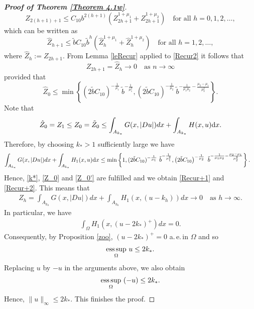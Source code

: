 \documentclass[10pt,reqno]{amsart}
\newcommand *\w{^\wedge}
\theoremstyle{definition}
\numberwithin{equation}{section}
\begin{document}
\begin{proof}[\textbf{Proof of Theorem \ref{Theorem 4.1w}}]
	\begin{equation*}
		Z_{2(h+1)+1}\leq C_{10} b^{2(h+1)}\left(Z_{2h+1}^{1+\mu_1}+Z_{2h+1}^{1+\mu_2}\right)\quad \text{for all } h=0,1,2,\ldots,
	\end{equation*}
	which can be written as
	\begin{equation}\label{Recur2}
		\hat{Z}_{h+1}\leq \tilde{b}C_{10} \tilde{b}^h\left(\hat{Z}_h^{1+\mu_1}+\hat{Z}_h^{1+\mu_2}\right) \quad \text{for all }h=1,2,\ldots,
	\end{equation}
	where $\hat{Z}_h:=Z_{2h+1}$. From Lemma \ref{leRecur} applied to \eqref{Recur2} it follows that
	\begin{equation}\label{Recur+2}
		Z_{2h+1}=\hat{Z}_h \to 0 \quad \text{as } n\to \infty
	\end{equation}
	provided that
	\begin{equation}\label{Z_0'}
		\hat{Z}_{0}\leq \min\left\{(2\tilde{b}C_{10})^{-\frac{1}{\mu_1}}\ \tilde{b}^{-\frac{1}{\mu_1^{2}}},\left(2\tilde{b}C_{10}\right)^{-\frac{1}{\mu_2}}\ \tilde{b}^{-\frac{1}{\mu_1\mu_2}-\frac{\mu_2-\mu_1}{\mu_2^{2}}}\right\}.
	\end{equation}
	Note that
	\begin{align*}
		\hat{Z}_{0}=Z_1\leq Z_0=\tilde{Z}_0\leq \int_{A_{k_*}}G(x,|D u|) d x+\int_{A_{k_*} }H(x,u){\rm d}x.
	\end{align*}
	Therefore, by choosing $k_*>1$ sufficiently large we have
	\begin{align*}
		\int_{A_{k_*}}G(x,|D u|) d x+\int_{A_{k_*} }H_1(x,u){\rm d}x
		&\leq \min\left\{1,(2\tilde{b}C_{10})^{-\frac{1}{\mu_1}}\ \tilde{b}^{-\frac{1}{\mu_1^{2}}},\left(2\tilde{b}C_{10}\right)^{-\frac{1}{\mu_2}}\ \tilde{b}^{-\frac{1}{\mu_1\mu_2}-\frac{\mu_2-\mu_1}{\mu_2^{2}}}\right\}.
	\end{align*}
	Hence, \eqref{k*}, \eqref{Z_0} and \eqref{Z_0'} are fulfilled and we obtain \eqref{Recur+1} and \eqref{Recur+2}. This means that
	\begin{align*}
		Z_h=\int_{A_{k_h}}G(x,|D u|) d x+\int_{A_{k_h} }H_1(x,(u-k_h)) d x\to 0 \quad \text{as } h\to\infty.
	\end{align*}
	In particular, we have
	\begin{align*}
		\int_{\Omega}H_1(x,(u-2k_*)^+)d x=0.
	\end{align*}
	Consequently, by Proposition \ref{zoo}, $(u-2k_*)^{+}=0$ a.\,e.\,in $\Omega$ and so
	\begin{align*}
		\underset{\Omega}{\mathop{\rm ess\,sup}}\ u \leq 2k_*.
	\end{align*}
Replacing $u$ by $-u$ in the arguments above, we also obtain
	\begin{align*}
		\underset{\Omega}{\mathop{\rm ess\,sup}}\ (-u) \leq 2k_*.
	\end{align*}
Hence, $\|u\|_\infty\leq 2k_*$. This finishes the proof.
\end{proof}
\end{document}
